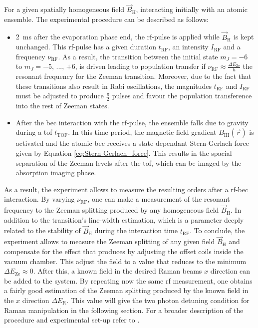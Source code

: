 For a given spatially homogeneous field $\vec{B}_\text{H}$, interacting initially with an atomic ensemble. The experimental procedure can be described as follows:
\begin{itemize}
	\item \SI{2}{\milli\second} after the evaporation phase end, the \ac{rf}-pulse is applied while $\vec{B}_\text{H}$ is kept unchanged. This \ac{rf}-pulse has a given duration $t_\text{RF}$, an intensity $I_\text{RF}$ and a frequency $\nu_\text{RF}$. As a result, the transition between the initial state $m_J=-6$ to $m_J=-5\text{, ..., +6}$, is driven leading to population transfer if $\nu_\text{RF}\approx\frac{\Delta E_\text{Ze}}{\hbar}$ the resonant frequency for the Zeeman transition. Moreover, due to the fact that these transitions also result in Rabi oscillations, the magnitudes $t_\text{RF}$ and $I_\text{RF}$ must be adjusted to produce $\frac{\pi}{2}$ pulses and favour the population transference into the rest of Zeeman states.
	\item After the \ac{bec} interaction with the \ac{rf}-pulse, the ensemble falls due to gravity during a \acl{tof} $t_\text{TOF}$. In this time period, the magnetic field gradient $B_\text{IH}(\vec{r})$ is activated and the atomic \ac{bec} receives a state dependant Stern-Gerlach force given by Equation \eqref{eq:Stern-Gerlach_force}. This results in the spacial separation of the Zeeman levels after the \ac{tof}, which can be imaged by the absorption imaging phase.
\end{itemize}

As a result, the experiment allows to measure the resulting orders after a \ac{rf}-\ac{bec} interaction. By varying $\nu_\text{RF}$, one can make a measurement of the resonant frequency to the Zeeman splitting produced by any homogeneous field $\vec{B}_\text{H}$. In addition to the transition's line-width estimation, which is a parameter deeply related to the stability of $\vec{B}_\text{H}$ during the interaction time $t_\text{RF}$. To conclude, the experiment allows to measure the Zeeman splitting of any given field $\vec{B}_\text{H}$ and compensate for the effect that produces by adjusting the offset coils inside the vacuum chamber. This adjust the field to a value that reduces to the minimum  $\Delta E_\text{Ze}\approx0$. After this, a known field in the desired Raman beams $x$ direction can be added to the system. By repeating now the same \ac{rf} measurement, one obtains a fairly good estimation of the Zeeman splitting produced by the known field in the $x$ direction $\Delta E_\text{R}$. This value will give the two photon detuning condition for Raman manipulation in the following section. For a broader description of the procedure and experimental set-up refer to \cite{Ulitzsch2016}.

